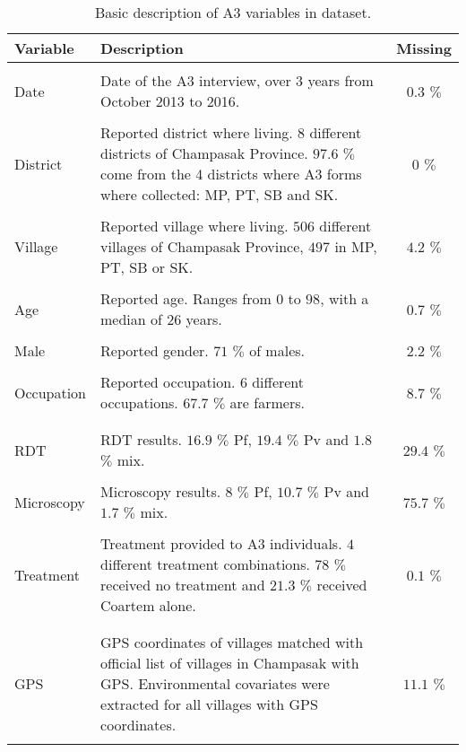 \documentclass{article}\usepackage[]{graphicx}\usepackage[]{color}
\begin{document}
\begin{table}[htp]
\begin{center}
\begin{tabular}{lp{10.5cm}c}
Variable & Description & Missing \\ \hline
&& \\
Date & Date of the A3 interview, over 3 years from October 2013 to 2016. & \(0.3\) $\%$ \\
&& \\
District & Reported district where living. \(8\) different districts of Champasak Province. \(97.6\) $\%$ come from the 4 districts where A3 forms where collected: MP, PT, SB and SK. & \(0\) $\%$ \\
&& \\
Village & Reported village where living. \(506\) different villages of Champasak Province, \(497\) in MP, PT, SB or SK. & \(4.2\) $\%$ \\ 
&& \\
Age & Reported age. Ranges from \(0\) to \(98\), with a median of \(26\) years. & \(0.7\) $\%$ \\ 
&& \\
Male & Reported gender. \(71\) $\%$ of males. & \(2.2\) $\%$ \\ 
&& \\
Occupation & Reported occupation. \(6\) different occupations. \(67.7\) $\%$ are farmers. & \(8.7\) $\%$ \\ 
&& \\ \hline
&& \\
RDT & RDT results. \(16.9\) $\%$ Pf, \(19.4\) $\%$ Pv and \(1.8\) $\%$ mix. & \(29.4\) $\%$ \\ 
&& \\
Microscopy & Microscopy results. \(8\) $\%$ Pf, \(10.7\) $\%$ Pv and \(1.7\) $\%$ mix. & \(75.7\) $\%$ \\ 
&& \\
Treatment & Treatment provided to A3 individuals. \(4\) different treatment combinations. \(78\) $\%$ received no treatment and \(21.3\) $\%$ received Coartem alone. & \(0.1\) $\%$ \\ 
&& \\ \hline
&& \\
GPS & GPS coordinates of villages matched with official list of villages in Champasak with GPS. Environmental covariates were extracted for all villages with GPS coordinates. & \(11.1\) $\%$ \\ 
&& \\ \hline

\end{tabular}
\caption{Basic description of A3 variables in dataset.}
\label{table:Table_Basic_Description_A3}
\end{center}
\end{table}
\end{document}
